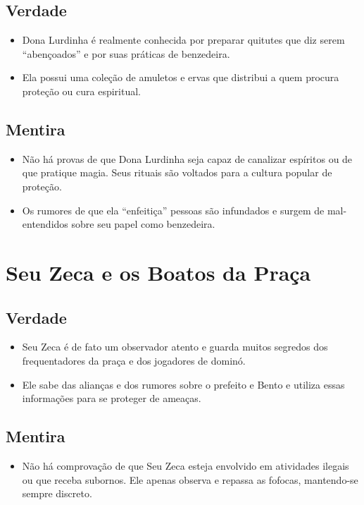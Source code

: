 \subsection*{Verdade}
\begin{itemize}
    \item Dona Lurdinha é realmente conhecida por preparar quitutes que diz serem “abençoados” e por suas práticas de benzedeira.
    \item Ela possui uma coleção de amuletos e ervas que distribui a quem procura proteção ou cura espiritual.
\end{itemize}

\subsection*{Mentira}
\begin{itemize}
    \item Não há provas de que Dona Lurdinha seja capaz de canalizar espíritos ou de que pratique magia. Seus rituais são voltados para a cultura popular de proteção.
    \item Os rumores de que ela “enfeitiça” pessoas são infundados e surgem de mal-entendidos sobre seu papel como benzedeira.
\end{itemize}

\section{Seu Zeca e os Boatos da Praça}

\subsection*{Verdade}
\begin{itemize}
    \item Seu Zeca é de fato um observador atento e guarda muitos segredos dos frequentadores da praça e dos jogadores de dominó.
    \item Ele sabe das alianças e dos rumores sobre o prefeito e Bento e utiliza essas informações para se proteger de ameaças.
\end{itemize}

\subsection*{Mentira}
\begin{itemize}
    \item Não há comprovação de que Seu Zeca esteja envolvido em atividades ilegais ou que receba subornos. Ele apenas observa e repassa as fofocas, mantendo-se sempre discreto.
\end{itemize}

